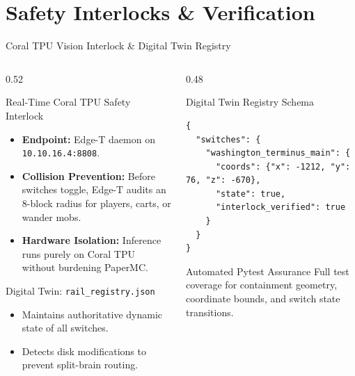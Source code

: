 \documentclass[aspectratio=169]{beamer}
\begin{document}
\section{Safety Interlocks \& Verification}

\begin{frame}[fragile]{Coral TPU Vision Interlock \& Digital Twin Registry}
	\begin{columns}[c]
		\begin{column}{0.52\textwidth}
			\begin{block}{Real-Time Coral TPU Safety Interlock}
				\begin{itemize}\footnotesize
					\item \textbf{Endpoint:} Edge-T daemon on \texttt{10.10.16.4:8808}.
					\item \textbf{Collision Prevention:} Before switches toggle, Edge-T audits an 8-block radius for players, carts, or wander mobs.
					\item \textbf{Hardware Isolation:} Inference runs purely on Coral TPU without burdening PaperMC\@.
				\end{itemize}
			\end{block}
			\begin{block}{Digital Twin: \texttt{rail\_registry.json}}
				\begin{itemize}\footnotesize
					\item Maintains authoritative dynamic state of all switches.
					\item Detects disk modifications to prevent split-brain routing.
				\end{itemize}
			\end{block}
		\end{column}
		\begin{column}{0.48\textwidth}
			\begin{exampleblock}{Digital Twin Registry Schema}
\begin{lstlisting}
{
  "switches": {
    "washington_terminus_main": {
      "coords": {"x": -1212, "y": 76, "z": -670},
      "state": true,
      "interlock_verified": true
    }
  }
}
\end{lstlisting}
			\end{exampleblock}
			\begin{block}{Automated Pytest Assurance}
				Full test coverage for containment geometry, coordinate bounds, and switch state transitions.
			\end{block}
		\end{column}
	\end{columns}
\end{frame}
\end{document}
